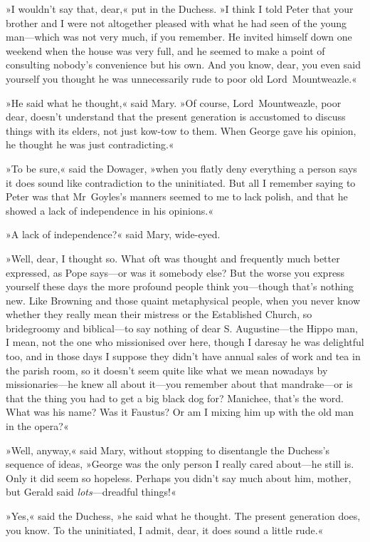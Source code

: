 »I wouldn't say that, dear,« put in the Duchess. »I think I told Peter that your brother and I were not altogether pleased with what he had seen of the young man—which was not very much, if you remember. He invited himself down one weekend when the house was very full, and he seemed to make a point of consulting nobody's convenience but his own. And you know, dear, you even said yourself you thought he was unnecessarily rude to poor old Lord~Mountweazle.«

»He said what he thought,« said Mary. »Of course, Lord~Mountweazle, poor dear, doesn't understand that the present generation is accustomed to discuss things with its elders, not just kow-tow to them. When George gave his opinion, he thought he was just contradicting.«

»To be sure,« said the Dowager, »when you flatly deny everything a person says it does sound like contradiction to the uninitiated. But all I remember saying to Peter was that Mr~Goyles's manners seemed to me to lack polish, and that he showed a lack of independence in his opinions.«

»A lack of independence?« said Mary, wide-eyed.

»Well, dear, I thought so. What oft was thought and frequently much better expressed, as Pope says—or was it somebody else? But the worse you express yourself these days the more profound people think you—though that's nothing new. Like Browning and those quaint metaphysical people, when you never know whether they really mean their mistress or the Established Church, so bridegroomy and biblical—to say nothing of dear S. Augustine—the Hippo man, I mean, not the one who missionised over here, though I daresay he was delightful too, and in those days I suppose they didn't have annual sales of work and tea in the parish room, so it doesn't seem quite like what we mean nowadays by missionaries—he knew all about it—you remember about that mandrake—or is that the thing you had to get a big black dog for?  Manichee, that's the word. What was his name? Was it Faustus? Or am I mixing him up with the old man in the opera?«

»Well, anyway,« said Mary, without stopping to disentangle the Duchess's sequence of ideas, »George was the only person I really cared about—he still is. Only it did seem so hopeless. Perhaps you didn't say much about him, mother, but Gerald said \textit{lots}—dreadful things!«

»Yes,« said the Duchess, »he said what he thought. The present generation does, you know. To the uninitiated, I admit, dear, it does sound a little rude.«

